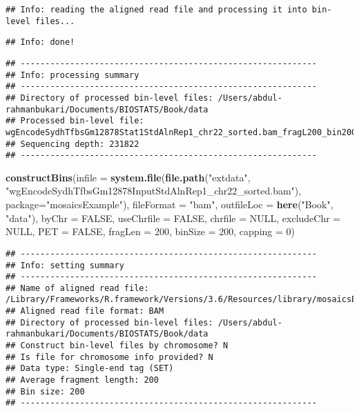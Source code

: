 \documentclass[]{article}
\newenvironment{Shaded}{\begin{snugshade}}{\end{snugshade}}
\newcommand{\DataTypeTok}[1]{\textcolor[rgb]{0.13,0.29,0.53}{#1}}
\newcommand{\DecValTok}[1]{\textcolor[rgb]{0.00,0.00,0.81}{#1}}
\newcommand{\KeywordTok}[1]{\textcolor[rgb]{0.13,0.29,0.53}{\textbf{#1}}}
\newcommand{\NormalTok}[1]{#1}
\newcommand{\OtherTok}[1]{\textcolor[rgb]{0.56,0.35,0.01}{#1}}
\newcommand{\StringTok}[1]{\textcolor[rgb]{0.31,0.60,0.02}{#1}}
\begin{document}
\begin{verbatim}
## Info: reading the aligned read file and processing it into bin-level files...
\end{verbatim}

\begin{verbatim}
## Info: done!
\end{verbatim}

\begin{verbatim}
## ------------------------------------------------------------
## Info: processing summary
## ------------------------------------------------------------
## Directory of processed bin-level files: /Users/abdul-rahmanbukari/Documents/BIOSTATS/Book/data 
## Processed bin-level file: wgEncodeSydhTfbsGm12878Stat1StdAlnRep1_chr22_sorted.bam_fragL200_bin200.txt
## Sequencing depth: 231822 
## ------------------------------------------------------------
\end{verbatim}

\begin{Shaded}
\begin{Highlighting}[]
\KeywordTok{constructBins}\NormalTok{(}\DataTypeTok{infile =} \KeywordTok{system.file}\NormalTok{(}\KeywordTok{file.path}\NormalTok{(}\StringTok{"extdata"}\NormalTok{, }\StringTok{"wgEncodeSydhTfbsGm12878InputStdAlnRep1_chr22_sorted.bam"}\NormalTok{), }\DataTypeTok{package=}\StringTok{"mosaicsExample"}\NormalTok{),}
    \DataTypeTok{fileFormat =} \StringTok{"bam"}\NormalTok{, }\DataTypeTok{outfileLoc =} \KeywordTok{here}\NormalTok{(}\StringTok{"Book"}\NormalTok{, }\StringTok{"data"}\NormalTok{),}
    \DataTypeTok{byChr =} \OtherTok{FALSE}\NormalTok{, }\DataTypeTok{useChrfile =} \OtherTok{FALSE}\NormalTok{, }\DataTypeTok{chrfile =} \OtherTok{NULL}\NormalTok{, }\DataTypeTok{excludeChr =} \OtherTok{NULL}\NormalTok{,}
    \DataTypeTok{PET =} \OtherTok{FALSE}\NormalTok{, }\DataTypeTok{fragLen =} \DecValTok{200}\NormalTok{, }\DataTypeTok{binSize =} \DecValTok{200}\NormalTok{, }\DataTypeTok{capping =} \DecValTok{0}\NormalTok{)}
\end{Highlighting}
\end{Shaded}

\begin{verbatim}
## ------------------------------------------------------------
## Info: setting summary
## ------------------------------------------------------------
## Name of aligned read file: /Library/Frameworks/R.framework/Versions/3.6/Resources/library/mosaicsExample/extdata/wgEncodeSydhTfbsGm12878InputStdAlnRep1_chr22_sorted.bam 
## Aligned read file format: BAM 
## Directory of processed bin-level files: /Users/abdul-rahmanbukari/Documents/BIOSTATS/Book/data 
## Construct bin-level files by chromosome? N 
## Is file for chromosome info provided? N 
## Data type: Single-end tag (SET)
## Average fragment length: 200 
## Bin size: 200 
## ------------------------------------------------------------
\end{verbatim}
\end{document}
